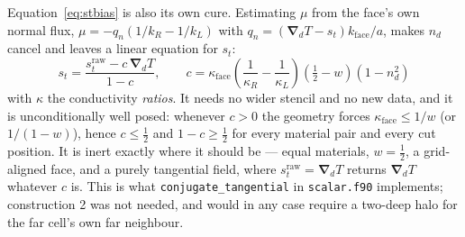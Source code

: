 \documentclass[11pt,a4paper]{article}
\newcommand{\grad}{\boldsymbol{\nabla}}
\newcommand{\code}[1]{\texttt{#1}}
\begin{document}
Equation~\eqref{eq:stbias} is also its own cure. Estimating $\mu$ from the
face's own normal flux, $\mu=-q_n(1/k_R-1/k_L)$ with
$q_n=(\grad_dT-s_t)k_{\text{face}}/a$, makes $n_d$ cancel and leaves a linear
equation for $s_t$:
\begin{equation}
  \boxed{\;
  s_t=\frac{s_t^{\text{raw}}-c\,\grad_dT}{1-c},
  \qquad
  c=\kappa_{\text{face}}\left(\frac{1}{\kappa_R}-\frac{1}{\kappa_L}\right)
     \left(\tfrac12-w\right)\left(1-n_d^{2}\right) \;}
  \label{eq:stdebias}
\end{equation}
with $\kappa$ the conductivity \emph{ratios}. It needs no wider stencil and no
new data, and it is unconditionally well posed: whenever $c>0$ the geometry
forces $\kappa_{\text{face}}\le1/w$ (or $1/(1-w)$), hence $c\le\tfrac12$ and
$1-c\ge\tfrac12$ for every material pair and every cut position. It is inert
exactly where it should be --- equal materials, $w=\tfrac12$, a grid-aligned
face, and a purely tangential field, where $s_t^{\text{raw}}=\grad_dT$ returns
$\grad_dT$ whatever $c$ is. This is what \code{conjugate\_tangential} in
\code{scalar.f90} implements; construction 2 was not needed, and would in any
case require a two-deep halo for the far cell's own far neighbour.
\end{document}
